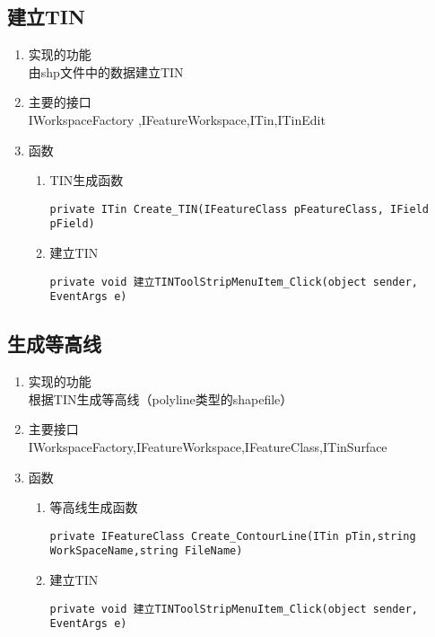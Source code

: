 \documentclass[twoside,color=blue,mathpazo,titlestyle=hang,12pt]{elegantbook}
\numberwithin{equation}{section}
\begin{document}
\subsection{建立TIN}
\begin{enumerate}
\item 实现的功能\\
由shp文件中的数据建立TIN
\item 主要的接口\\
IWorkspaceFactory ,IFeatureWorkspace,ITin,ITinEdit
\item 函数\\
\begin{enumerate}
\item TIN生成函数
\begin{lstlisting} 
private ITin Create_TIN(IFeatureClass pFeatureClass, IField pField) 
\end{lstlisting}
\item 建立TIN
\begin{lstlisting}
private void 建立TINToolStripMenuItem_Click(object sender, EventArgs e)
\end{lstlisting}
\end{enumerate}
\end{enumerate}
\subsection{生成等高线}
\begin{enumerate}
\item 实现的功能\\
根据TIN生成等高线（polyline类型的shapefile）
\item 主要接口\\
IWorkspaceFactory,IFeatureWorkspace,IFeatureClass,ITinSurface
\item 函数
\begin{enumerate}
\item 等高线生成函数
\begin{lstlisting}
private IFeatureClass Create_ContourLine(ITin pTin,string WorkSpaceName,string FileName)   
\end{lstlisting}
\item 建立TIN
\begin{lstlisting}
private void 建立TINToolStripMenuItem_Click(object sender, EventArgs e)
\end{lstlisting}
\end{enumerate}
\end{enumerate}
\end{document}

